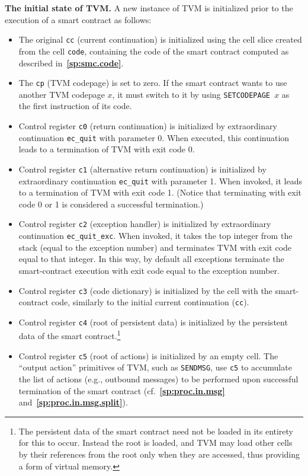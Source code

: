 \documentclass[12pt,oneside]{article}
\def\makepoint#1{\medbreak\noindent{\bf #1.\ }}
\def\nxsubpoint{\refstepcounter{subsubsection}%
  \smallbreak\makepoint{\thesubsubsection}}
\def\refpoint#1{{\rm\textbf{\ref{#1}}}}
\let\ptref=\refpoint
\def\emb#1{\textbf{#1.}}
\begin{document}
\nxsubpoint\label{sp:tvm.smc.init}\emb{The initial state of TVM}
A new instance of TVM is initialized prior to the execution of a smart contract as follows:
\begin{itemize}
\item The original {\tt cc} (current continuation) is initialized using the cell slice created from the cell {\tt code}, containing the code of the smart contract computed as described in~\ptref{sp:smc.code}.
\item The {\tt cp} (TVM codepage) is set to zero. If the smart contract wants to use another TVM codepage $x$, it must switch to it by using {\tt SETCODEPAGE $x$} as the first instruction of its code.
\item Control register {\tt c0} (return continuation) is initialized by extraordinary continuation {\tt ec\_quit} with parameter 0. When executed, this continuation leads to a termination of TVM with exit code 0.
\item Control register {\tt c1} (alternative return continuation) is initialized by extraordinary continuation {\tt ec\_quit} with parameter 1. When invoked, it leads to a termination of TVM with exit code 1. (Notice that terminating with exit code 0 or 1 is considered a successful termination.)
\item Control register {\tt c2} (exception handler) is initialized by extraordinary continuation {\tt ec\_quit\_exc}. When invoked, it takes the top integer from the stack (equal to the exception number) and terminates TVM with exit code equal to that integer. In this way, by default all exceptions terminate the smart-contract execution with exit code equal to the exception number.
\item Control register {\tt c3} (code dictionary) is initialized by the cell with the smart-contract code, similarly to the initial current continuation ({\tt cc}).
\item Control register {\tt c4} (root of persistent data) is initialized by the persistent data of the smart contract.\footnote{The persistent data of the smart contract need not be loaded in its entirety for this to occur. Instead the root is loaded, and TVM may load other cells by their references from the root only when they are accessed, thus providing a form of virtual memory.}
\item Control register {\tt c5} (root of actions) is initialized by an empty cell. The ``output action'' primitives of TVM, such as {\tt SENDMSG}, use {\tt c5} to accumulate the list of actions (e.g., outbound messages) to be performed upon successful termination of the smart contract (cf.~\ptref{sp:proc.in.msg} and~\ptref{sp:proc.in.msg.split}).

\end{itemize}
\end{document}
